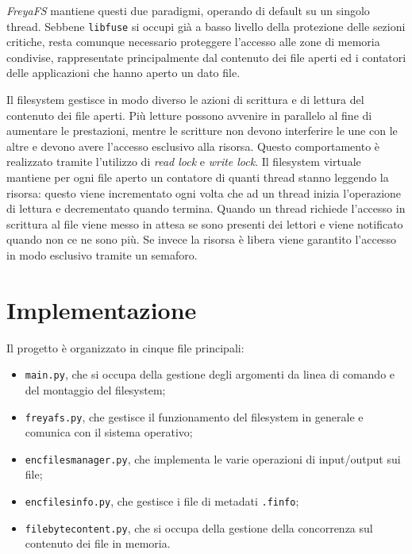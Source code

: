 \documentclass[a4paper,12pt,twoside,openright]{report}
\begin{document}
  \textit{FreyaFS} mantiene questi due paradigmi, operando di default su un singolo \mbox{thread}.
  Sebbene \texttt{libfuse} si occupi già a basso livello della protezione delle sezioni critiche,
  resta comunque necessario proteggere l'accesso alle zone di memoria condivise,
  rappresentate principalmente dal contenuto dei file aperti ed i contatori delle applicazioni
  che hanno aperto un dato file.
  
  Il filesystem gestisce in modo diverso le azioni di scrittura e di lettura del contenuto dei file aperti.
  Più letture possono avvenire in parallelo al fine di aumentare le prestazioni, mentre le scritture non devono
  interferire le une con le altre e devono avere l'accesso esclusivo alla risorsa.
  Questo comportamento è realizzato tramite l'utilizzo di \textit{read lock} e \textit{write lock}.
  Il filesystem virtuale mantiene per ogni file aperto un contatore di quanti thread stanno leggendo la risorsa:
  questo viene incrementato ogni volta che ad un thread inizia l'operazione di lettura e decrementato quando termina.
  Quando un thread richiede l'accesso in scrittura al file viene messo in attesa se sono presenti dei lettori
  e viene notificato quando non ce ne sono più. Se invece la risorsa è libera viene garantito l'accesso in modo
  esclusivo tramite un semaforo.

  \section{Implementazione}

  Il progetto è organizzato in cinque file principali:

  \begin{itemize}
    \item \texttt{main.py}, che si occupa della gestione degli argomenti da linea di comando e del montaggio del filesystem;
    \item \texttt{freyafs.py}, che gestisce il funzionamento del filesystem in generale e comunica con il sistema operativo;
    \item \texttt{encfilesmanager.py}, che implementa le varie operazioni di input/output sui file;
    \item \texttt{encfilesinfo.py}, che gestisce i file di metadati \texttt{.finfo};
    \item \texttt{filebytecontent.py}, che si occupa della gestione della concorrenza sul contenuto dei file in memoria.
  \end{itemize}
\end{document}

